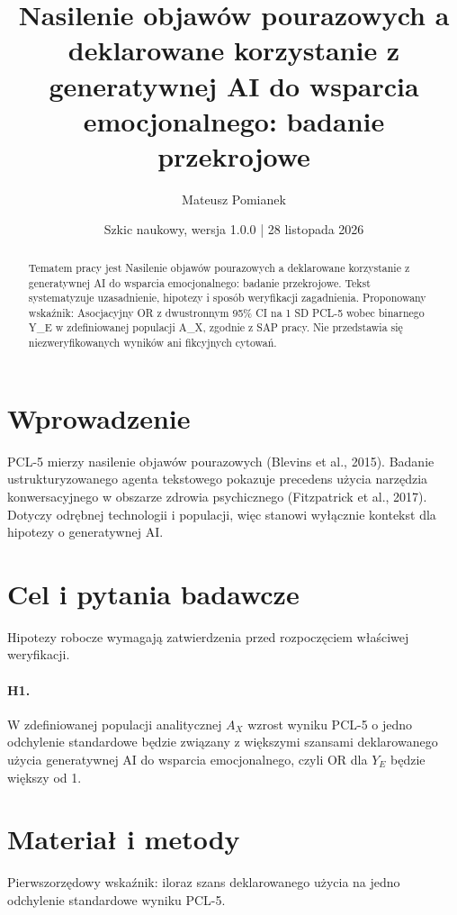 \documentclass[11pt,a4paper]{article}
\title{Nasilenie objawów pourazowych a deklarowane korzystanie z generatywnej AI do wsparcia emocjonalnego: badanie przekrojowe}
\author{Mateusz Pomianek}
\date{Szkic naukowy, wersja 1.0.0 | 28 listopada 2026}
\begin{document}
\maketitle

\begin{abstract}

Tematem pracy jest Nasilenie objawów pourazowych a deklarowane korzystanie z generatywnej AI do wsparcia emocjonalnego: badanie przekrojowe. Tekst systematyzuje uzasadnienie, hipotezy i sposób weryfikacji zagadnienia. Proponowany wskaźnik: Asocjacyjny OR z dwustronnym 95\% CI na 1 SD PCL-5 wobec binarnego Y\_E w zdefiniowanej populacji A\_X, zgodnie z SAP pracy. Nie przedstawia się niezweryfikowanych wyników ani fikcyjnych cytowań.

\end{abstract}

\section{Wprowadzenie}

PCL-5 mierzy nasilenie objawów pourazowych (Blevins et al., 2015). Badanie ustrukturyzowanego agenta tekstowego pokazuje precedens użycia narzędzia konwersacyjnego w obszarze zdrowia psychicznego (Fitzpatrick et al., 2017). Dotyczy odrębnej technologii i populacji, więc stanowi wyłącznie kontekst dla hipotezy o generatywnej AI.

\section{Cel i pytania badawcze}

Hipotezy robocze wymagają zatwierdzenia przed rozpoczęciem właściwej weryfikacji.

\paragraph{H1.} W zdefiniowanej populacji analitycznej $A_X$ wzrost wyniku PCL-5 o jedno odchylenie standardowe będzie związany z większymi szansami deklarowanego użycia generatywnej AI do wsparcia emocjonalnego, czyli OR dla $Y_E$ będzie większy od 1.

\section{Materiał i metody}

Pierwszorzędowy wskaźnik: iloraz szans deklarowanego użycia na jedno odchylenie standardowe wyniku PCL-5.
\end{document}
